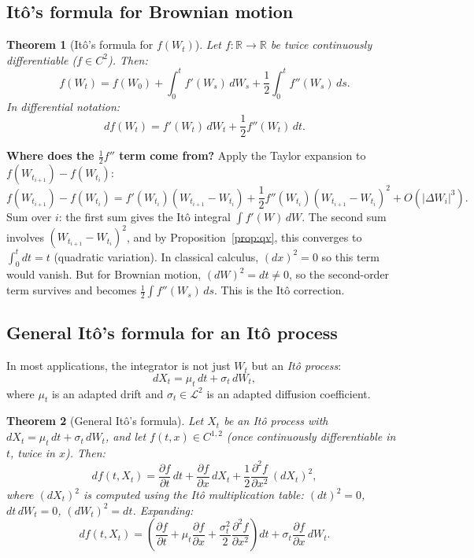 \documentclass[11pt,a4paper]{article}
\theoremstyle{definition}
\theoremstyle{plain}
\newtheorem{theorem}{Theorem}[section]
\theoremstyle{remark}
\newcommand{\R}{\mathbb{R}}
\newcommand{\calL}{\mathcal{L}}
\newcommand{\abs}[1]{\left|#1\right|}
\begin{document}
\subsection{Itô's formula for Brownian motion}

\begin{theorem}[Itô's formula for $f(W_t)$]
\label{thm:ito-scalar}
Let $f: \R \to \R$ be twice continuously differentiable ($f \in C^2$). Then:
\begin{equation}
  \label{eq:ito-scalar}
  f(W_t) = f(W_0) + \int_0^t f'(W_s)\,dW_s + \frac{1}{2}\int_0^t f''(W_s)\,ds.
\end{equation}
In differential notation:
\[
  df(W_t) = f'(W_t)\,dW_t + \frac{1}{2}f''(W_t)\,dt.
\]
\end{theorem}

\begin{tutobox}
\textbf{Where does the $\frac{1}{2}f''$ term come from?}
Apply the Taylor expansion to $f(W_{t_{i+1}}) - f(W_{t_i})$:
\[
  f(W_{t_{i+1}}) - f(W_{t_i}) = f'(W_{t_i})(W_{t_{i+1}}-W_{t_i}) + \frac{1}{2}f''(W_{t_i})(W_{t_{i+1}}-W_{t_i})^2 + O(\abs{\Delta W_i}^3).
\]
Sum over $i$: the first sum gives the Itô integral $\int f'(W)\,dW$. The second sum involves $(W_{t_{i+1}} - W_{t_i})^2$, and by Proposition~\ref{prop:qv}, this converges to $\int_0^t dt = t$ (quadratic variation). In classical calculus, $(dx)^2 = 0$ so this term would vanish. But for Brownian motion, $(dW)^2 = dt \neq 0$, so the second-order term survives and becomes $\frac{1}{2}\int f''(W_s)\,ds$. This is the Itô correction.
\end{tutobox}

\subsection{General Itô's formula for an Itô process}

In most applications, the integrator is not just $W_t$ but an \emph{Itô process}:
\[
  dX_t = \mu_t\,dt + \sigma_t\,dW_t,
\]
where $\mu_t$ is an adapted drift and $\sigma_t \in \calL^2$ is an adapted diffusion coefficient.

\begin{theorem}[General Itô's formula]
\label{thm:ito-general}
Let $X_t$ be an Itô process with $dX_t = \mu_t\,dt + \sigma_t\,dW_t$, and let $f(t,x) \in C^{1,2}$ (once continuously differentiable in $t$, twice in $x$). Then:
\begin{equation}
  \label{eq:ito-general}
  df(t, X_t) = \frac{\partial f}{\partial t}\,dt + \frac{\partial f}{\partial x}\,dX_t + \frac{1}{2}\frac{\partial^2 f}{\partial x^2}\,(dX_t)^2,
\end{equation}
where $(dX_t)^2$ is computed using the Itô multiplication table: $(dt)^2 = 0$, $dt\,dW_t = 0$, $(dW_t)^2 = dt$. Expanding:
\[
  df(t, X_t) = \left(\frac{\partial f}{\partial t} + \mu_t\frac{\partial f}{\partial x} + \frac{\sigma_t^2}{2}\frac{\partial^2 f}{\partial x^2}\right)dt + \sigma_t\frac{\partial f}{\partial x}\,dW_t.
\]
\end{theorem}
\end{document}
